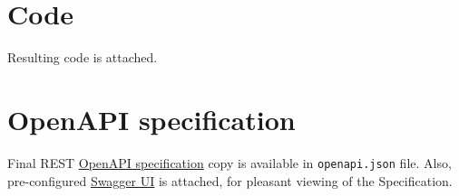 \chapter{Code}
Resulting code is attached.

\chapter{OpenAPI specification}
Final REST \hyperref[sec:openapi]{OpenAPI specification} copy is available in \texttt{openapi.json} file.
Also, pre-configured \hyperref[sec:swagger]{Swagger UI} is attached, for pleasant viewing of the Specification.
